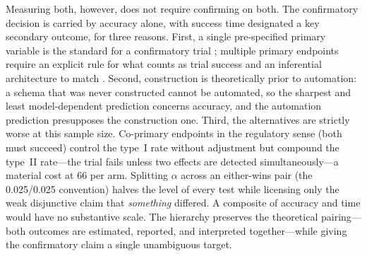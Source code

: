 Measuring both, however, does not require confirming on both. The confirmatory decision is carried by accuracy alone, with success time designated a key secondary outcome, for three reasons. First, a single pre-specified primary variable is the standard for a confirmatory trial \parencite{ich1998}; %
multiple primary endpoints require an explicit rule for what counts as trial success and an inferential architecture to match \parencite{pocock1997}. Second, construction is theoretically prior to automation: a schema that was never constructed cannot be automated, so the sharpest and least model-dependent prediction concerns accuracy, and the automation prediction presupposes the construction one. Third, the alternatives are strictly worse at this sample size. Co-primary endpoints in the regulatory sense (both must succeed) control the type~I rate without adjustment but compound the type~II rate---the trial fails unless two effects are detected simultaneously---a material cost at 66 per arm. Splitting $\alpha$ across an either-wins pair (the 0.025/0.025 convention) halves the level of every test while licensing only the weak disjunctive claim that \emph{something} differed. A composite of accuracy and time would have no substantive scale. The hierarchy preserves the theoretical pairing---both outcomes are estimated, reported, and interpreted together---while giving the confirmatory claim a single unambiguous target.

